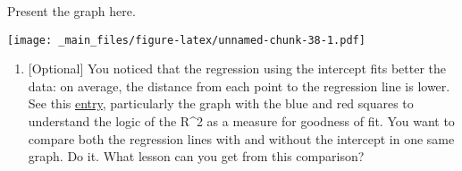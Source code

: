 \documentclass[
]{book}
\newenvironment{Shaded}{\begin{snugshade}}{\end{snugshade}}
\newcommand{\AttributeTok}[1]{\textcolor[rgb]{0.13,0.29,0.53}{#1}}
\newcommand{\CommentTok}[1]{\textcolor[rgb]{0.56,0.35,0.01}{\textit{#1}}}
\newcommand{\ConstantTok}[1]{\textcolor[rgb]{0.56,0.35,0.01}{#1}}
\newcommand{\DecValTok}[1]{\textcolor[rgb]{0.00,0.00,0.81}{#1}}
\newcommand{\FunctionTok}[1]{\textcolor[rgb]{0.13,0.29,0.53}{\textbf{#1}}}
\newcommand{\NormalTok}[1]{#1}
\newcommand{\SpecialCharTok}[1]{\textcolor[rgb]{0.81,0.36,0.00}{\textbf{#1}}}
\newcommand{\StringTok}[1]{\textcolor[rgb]{0.31,0.60,0.02}{#1}}
\providecommand{\tightlist}{%
  \setlength{\itemsep}{0pt}\setlength{\parskip}{0pt}}
\begin{document}
Present the graph here.

\begin{Shaded}
\end{Shaded}

\texttt{[image: \_main\_files/figure-latex/unnamed-chunk-38-1.pdf]}

\begin{enumerate}
\def\labelenumi{\roman{enumi}.}
\tightlist
\item
  {[}Optional{]} You noticed that the regression using the intercept fits better the data: on average, the distance from each point to the regression line is lower. See this \href{https://en.wikipedia.org/wiki/Coefficient_of_determination}{entry}, particularly the graph with the blue and red squares to understand the logic of the R\^{}2 as a measure for goodness of fit. You want to compare both the regression lines with and without the intercept in one same graph. Do it. What lesson can you get from this comparison?
\end{enumerate}
\end{document}
